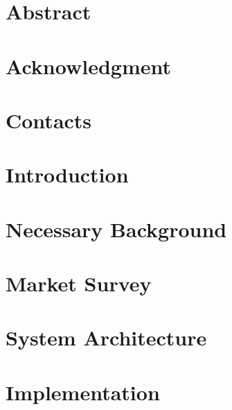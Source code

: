 \documentclass[12pt,twoside]{report}
\begin{document}
	
	
	
	\chapter*{Abstract}
	
	
	
	\chapter*{Acknowledgment}
	
	
	
	\chapter*{Contacts}
	


	\tableofcontents
	\listoffigures
	\listoftables
	\clearpage	%
	\pagestyle{fancy}
	
	\chapter{Introduction}
	
	
	\chapter{Necessary Background}
	
	
	\chapter{Market Survey}
	
	
	\chapter{System Architecture}
	
	
	\chapter{Implementation}
	
	
\end{document}
